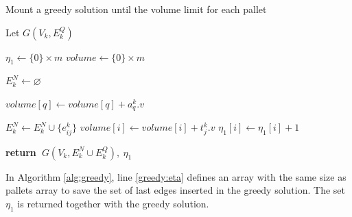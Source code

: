 \documentclass[preprint,authoryear]{elsarticle}
\renewcommand{\Return}{\State \bf {return}~}
\begin{document}
\begin{algorithm}[H]
	\caption{Mount a greedy solution until the volume limit for each pallet}  \label{alg:greedy}
	
	\begin{algorithmic}[1]
		
		
		\State Let $G(V_k, E^Q_k)$
		
		\State $\eta_1 \gets \{0\} \times m$ \label{greedy:eta}
		\State $volume \gets \{0\} \times m$
		
		\State $E^N_k \gets \varnothing$ 			
		
				\State $volume[q] \gets volume[q] + a_q^k.v$ 
			\EndIf		
		\EndFor
			
				\State $E^N_k \gets E^N_k \cup \{e_{ij}^k\}$ 
				\State $volume[i] \gets volume[i] + t_j^k.v$
				\State $\eta_1[i] \gets \eta_1[i] + 1$ 	
			\EndIf
		\EndFor
		
		\Return $G(V_k, E^N_k \cup E^Q_k),\ \eta_1$ 
		
		\EndProcedure
		
	\end{algorithmic}
\end{algorithm}

In Algorithm \ref{alg:greedy}, line \ref{greedy:eta} defines an array with the same size as pallets array to save the set of last edges inserted in the greedy solution. The set $\eta_1$ is returned together with the greedy solution.
\end{document}
